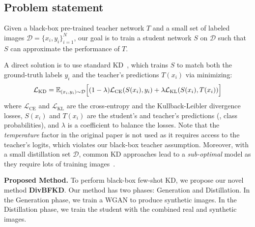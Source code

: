 \subsection{Problem statement}
\begin{foldable}
  Given a black-box pre-trained teacher network $T$ and a small set of labeled images $\mathcal{D}=\{x_{i},y_{i}\}_{i=1}^{N}$, our goal is to train a student network $S$ on $\mathcal{D}$ such that $S$ can approximate the performance of $T$.
\end{foldable}

\begin{foldable}
  A direct solution is to use standard KD~\cite{hinton2015distilling}, which trains $S$ to match both the ground-truth labels $y_{i}$ and the teacher's predictions $T(x_{i})$ via minimizing:
  \begin{equation}
    \mathcal{L}_\text{KD} = \mathbb{E}_{(x_{i}, y_{i}) \sim \mathcal{D}} \Bigl[{
        (1 - \lambda) \mathcal{L}_{\text{CE}}(S(x_{i}), y_{i}) +
        \lambda \mathcal{L}_{\text{KL}}(S(x_{i}), T(x_{i}))
    }\Bigr]
    \label{eq:StandardKD}
  \end{equation}
  where $\mathcal{L}_{\text{CE}}$ and $\mathcal{L}_{\text{KL}}$ are the cross-entropy and the Kullback-Leibler divergence losses, $S(x_{i})$ and $T(x_{i})$ are the student's and teacher's predictions (\ie, class probabilities), and $\lambda$ is a coefficient to balance the losses.
  Note that the \textit{temperature} factor in the original paper is not used as it requires access to the teacher's logits, which violates our black-box teacher assumption.
  Moreover, with a small distillation set $\mathcal{D}$, common KD approaches lead to a \textit{sub-optimal} model as they require lots of training images~\cite{hinton2015distilling,kim2018paraphrasing,ahn2019variational,tian2020contrastive}.
\end{foldable}

\begin{foldable}
  \textbf{Proposed Method.}
  To perform black-box few-shot KD, we propose our novel method \textbf{DivBFKD}.
  Our method has two phases: Generation and Distillation.
  In the Generation phase, we train a WGAN to produce synthetic images.
  In the Distillation phase, we train the student with the combined real and synthetic images.
\end{foldable}

